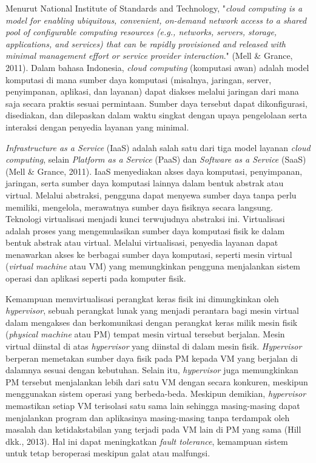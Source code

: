 Menurut National Institute of Standards and Technology, "\textit{cloud computing is a model for enabling ubiquitous, convenient, on-demand network access to a shared pool of configurable computing resources (e.g., networks, servers, storage, applications, and services) that can be rapidly provisioned and released with minimal management effort or service provider interaction}." (Mell \& Grance, 2011). Dalam bahasa Indonesia, \textit{cloud computing} (komputasi awan) adalah model komputasi di mana sumber daya komputasi (misalnya, jaringan, server, penyimpanan, aplikasi, dan layanan) dapat diakses melalui jaringan dari mana saja secara praktis sesuai permintaan. Sumber daya tersebut dapat dikonfigurasi, disediakan, dan dilepaskan dalam waktu singkat dengan upaya pengelolaan serta interaksi dengan penyedia layanan yang minimal. 

\textit{Infrastructure as a Service} (IaaS) adalah salah satu dari tiga model layanan \textit{cloud computing}, selain \textit{Platform as a Service} (PaaS) dan \textit{Software as a Service} (SaaS) (Mell \& Grance, 2011). IaaS menyediakan akses daya komputasi, penyimpanan, jaringan, serta sumber daya komputasi lainnya dalam bentuk abstrak atau virtual. Melalui abstraksi, pengguna dapat menyewa sumber daya tanpa perlu memiliki, mengelola, merawatnya sumber daya fisiknya secara langsung. Teknologi virtualisasi menjadi kunci terwujudnya abstraksi ini. Virtualisasi adalah proses yang mengemulasikan sumber daya komputasi fisik ke dalam bentuk abstrak atau virtual. Melalui virtualisasi, penyedia layanan dapat menawarkan akses ke berbagai sumber daya komputasi, seperti mesin virtual (\textit{virtual machine} atau VM) yang memungkinkan pengguna menjalankan sistem operasi dan aplikasi seperti pada komputer fisik.
 
Kemampuan memvirtualisasi perangkat keras fisik ini dimungkinkan oleh \textit{hypervisor}, sebuah perangkat lunak yang menjadi perantara bagi mesin virtual dalam mengakses dan berkomunikasi dengan perangkat keras milik mesin fisik (\textit{physical machine} atau PM) tempat mesin virtual tersebut berjalan. Mesin virtual diinstal di atas \textit{hypervisor} yang diinstal di dalam mesin fisik. \textit{Hypervisor} berperan memetakan sumber daya fisik pada PM kepada VM yang berjalan di dalamnya sesuai dengan kebutuhan. Selain itu, \textit{hypervisor} juga memungkinkan PM tersebut menjalankan lebih dari satu VM dengan secara konkuren, meskipun menggunakan sistem operasi yang berbeda-beda. Meskipun demikian, \textit{hypervisor} memastikan setiap VM terisolasi satu sama lain sehingga masing-masing dapat menjalankan program dan aplikasinya masing-masing tanpa terdampak oleh masalah dan ketidakstabilan yang terjadi pada VM lain di PM yang sama (Hill dkk., 2013). Hal ini dapat meningkatkan \textit{fault tolerance}, kemampuan sistem untuk tetap beroperasi meskipun galat atau malfungsi. 

